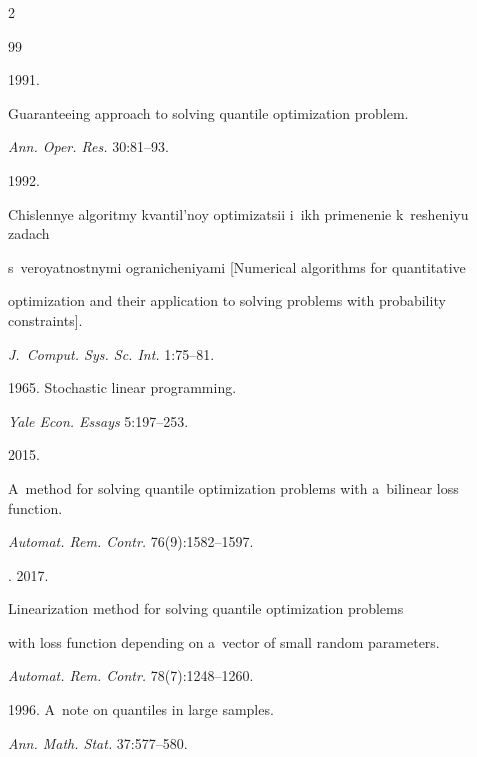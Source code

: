 \begin{multicols}{2}
{{\begin{thebibliography}{99}

 1991. 

Guaranteeing approach to solving quantile optimization problem.

\textit{Ann. Oper. Res.} 30:81--93.




 1992.

 Chislennye algoritmy kvantil'noy optimizatsii i~ikh primenenie k~re\-she\-niyu zadach 

 s~veroyatnostnymi ogranicheniyami [Numerical algorithms for quantitative 

 optimization and their application to solving problems with probability constraints].

 \textit{J.~Comput. Sys. Sc. Int.}  1:75--81.

 


 1965. Stochastic linear programming.

\textit{Yale Econ. Essays} 5:197--253.


 2015.

 A~method for solving quantile optimization problems with a~bilinear loss function.

 \textit{Automat. Rem. Contr.} 76(9):1582--1597.


. 2017. 

Linearization method for solving quantile optimization problems 

with loss function depending on a~vector of small random parameters.

\textit{Automat. Rem. Contr.} 78(7):1248--1260.


 1996. A~note on quantiles in large samples.

\textit{Ann. Math. Stat.} 37:577--580.

\end{thebibliography}



 }

 }



\end{multicols}



